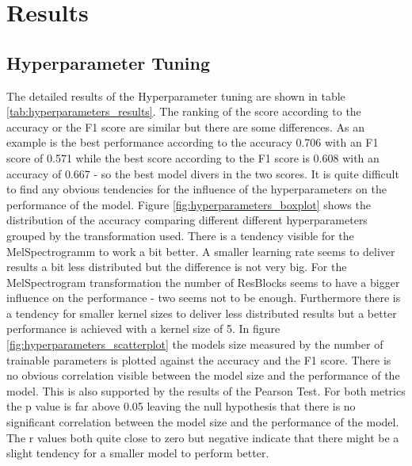 


\section{Results}
\label{results}

\subsection{Hyperparameter Tuning}%

The detailed results of the Hyperparameter tuning are shown in table \ref{tab:hyperparameters_results}.
The ranking of the score according to the accuracy or the F1 score are similar but there are some differences.
As an example is the best performance according to the accuracy 0.706 with an F1 score of 0.571 while 
the best score according to the F1 score is 0.608 with an accuracy of 0.667 - so the best model
divers in the two scores.
It is quite difficult to find any obvious tendencies for the influence of the hyperparameters on the performance of the model.
Figure \ref{fig:hyperparameters_boxplot} shows the distribution of the accuracy comparing different different hyperparameters
grouped by the transformation used. There is a tendency visible for the MelSpectrogramm to work a bit better.
A smaller learning rate seems to deliver results a bit less distributed but the difference is not very big.
For the MelSpectrogram transformation the number of ResBlocks seems to have a bigger influence on the performance -
two seems not to be enough. Furthermore there is a tendency for smaller kernel sizes to deliver less distributed results
but a better performance is achieved with a kernel size of 5. In figure \ref{fig:hyperparameters_scatterplot} the
models size measured by the number of trainable parameters is plotted against the accuracy and the F1 score.
There is no obvious correlation visible between the model size and the performance of the model.
This is also supported by the results of the Pearson Test. For both metrics the p value is far above 0.05 leaving the null hypothesis
that there is no significant correlation between the model size and the performance of the model.
The r values both quite close to zero but negative indicate that there might be a slight tendency for a smaller model to perform better.
